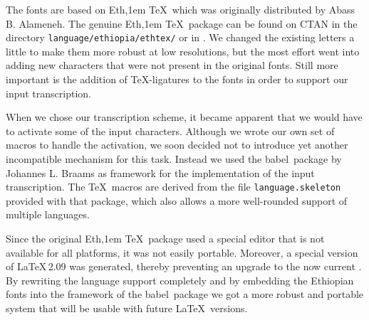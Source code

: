 \documentclass[a4paper]{article}
\newcommand*\babel{\textsf{babel}}
\newcommand*\EthTeX{Eth\kern-0,1em \TeX}
\begin{document}
The fonts are based on \EthTeX\ which was originally distributed
by Abass B. Alameneh. The genuine \EthTeX\ package can be
found on CTAN in the directory \texttt{language/ethiopia/ethtex/}
or in \cite{ethio97}. We changed the existing letters a little to make
them more robust at low resolutions, but the most effort went into
adding new characters that were not present in the original fonts.
Still more important is the addition of \TeX-ligatures to
the fonts in order to support our input transcription.

When we chose our transcription scheme, it became apparent that
we would have to activate some of the input characters.
Although we wrote our own set of macros to handle the
activation, we soon decided not to introduce yet another
incompatible mechanism for this task. Instead we used
the \babel\ package by Johannes L. Braams \cite{Bra97} as
framework for the implementation of the input transcription.
The \TeX\ macros are derived from the file
\texttt{language.skeleton} provided with that package, which
also allows a more well-rounded support of multiple
languages.

Since the original \EthTeX\ package used a special editor
that is not available for all platforms, it was not easily
portable. Moreover, a special version of \LaTeX\,2.09 was
generated, thereby preventing an upgrade to the now current
\LaTeXe. By rewriting the language support completely and
by embedding the Ethiopian fonts into the framework of
the \babel\ package we got a more robust and portable
system that will be usable with future \LaTeX\ versions.
\end{document}

